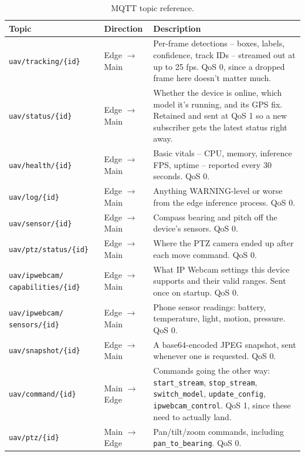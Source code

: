 \documentclass[12pt,a4paper]{report}
\renewcommand{\arraystretch}{1.1}
\begin{document}
\begin{table}[H]
\centering
\small
\caption[MQTT topic reference]{MQTT topic reference.}
\label{tab:mqtt_topics}
\renewcommand{\arraystretch}{0.9}
\begin{tabular}{|p{}|p{}|p{}|}
\hline
\rowcolor{gray!20}
\textbf{Topic} & \textbf{Direction} & \textbf{Description} \\
\hline
\texttt{uav/tracking/\{id\}} & Edge $\to$ Main & Per-frame detections -- boxes, labels, confidence, track IDs -- streamed out at up to 25 fps. QoS 0, since a dropped frame here doesn't matter much. \\
\hline
\texttt{uav/status/\{id\}} & Edge $\to$ Main & Whether the device is online, which model it's running, and its GPS fix. Retained and sent at QoS 1 so a new subscriber gets the latest status right away. \\
\hline
\texttt{uav/health/\{id\}} & Edge $\to$ Main & Basic vitals -- CPU, memory, inference FPS, uptime -- reported every 30 seconds. QoS 0. \\
\hline
\texttt{uav/log/\{id\}} & Edge $\to$ Main & Anything WARNING-level or worse from the edge inference process. QoS 0. \\
\hline
\texttt{uav/sensor/\{id\}} & Edge $\to$ Main & Compass bearing and pitch off the device's sensors. QoS 0. \\
\hline
\texttt{uav/ptz/status/\{id\}} & Edge $\to$ Main & Where the PTZ camera ended up after each move command. QoS 0. \\
\hline
\texttt{uav/ipwebcam/} \texttt{capabilities/\{id\}} & Edge $\to$ Main & What IP Webcam settings this device supports and their valid ranges. Sent once on startup. QoS 0. \\
\hline
\texttt{uav/ipwebcam/} \texttt{sensors/\{id\}} & Edge $\to$ Main & Phone sensor readings: battery, temperature, light, motion, pressure. QoS 0. \\
\hline
\texttt{uav/snapshot/\{id\}} & Edge $\to$ Main & A base64-encoded JPEG snapshot, sent whenever one is requested. QoS 0. \\
\hline
\texttt{uav/command/\{id\}} & Main $\to$ Edge & Commands going the other way: \texttt{start\_stream}, \texttt{stop\_stream}, \texttt{switch\_model}, \texttt{update\_config}, \texttt{ipwebcam\_control}. QoS 1, since these need to actually land. \\
\hline
\texttt{uav/ptz/\{id\}} & Main $\to$ Edge & Pan/tilt/zoom commands, including \texttt{pan\_to\_bearing}. QoS 0. \\
\hline
\end{tabular}
\end{table}
\end{document}
